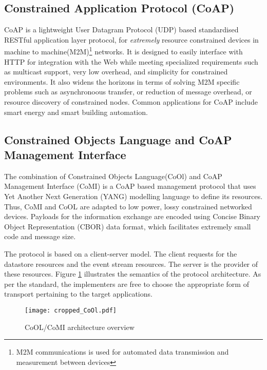 \documentclass[english]{tktltiki}
\begin{document}
\subsection{Constrained Application Protocol (CoAP)}

CoAP \cite{CoAPstandard} is a lightweight User Datagram Protocol (UDP) based standardised RESTful application layer protocol, for \textit{extremely} resource constrained devices in machine to machine(M2M)\footnote{M2M communications is used for automated data transmission and measurement between devices} networks. It is designed to easily interface with HTTP for integration with the Web while meeting specialized requirements such as multicast support, very low overhead, and simplicity for constrained environments\cite{CoAPstandard}. It also widens the horizons in terms of solving M2M specific problems such as asynchronoous transfer, or reduction of message overhead, or resource discovery of constrained nodes. Common applications for CoAP include smart energy and smart building automation.


\subsection{Constrained Objects Language and CoAP Management Interface}

The combination of Constrained Objects Language(CoOl)\cite{cool} and CoAP Management Interface (CoMI)\cite{comi} is a CoAP based management protocol that uses Yet Another Next Generation (YANG)\cite{yang} modelling language to define its resources. Thus, CoMI and CoOL are adapted to low power, lossy constrained networked devices. Payloads for the information exchange are encoded using Concise Binary Object Representation (CBOR)\cite{cobr} data format, which facilitates extremely small code and message size.

The protocol is based on a client-server model. The client requests for the datastore resources and the event stream resources. The server is the provider of these resources. Figure \ref{cool_archi} illustrates the semantics of the protocol architecture. As per the standard, the implementers are free to choose the appropriate form of transport pertaining to the target applications.

\begin{figure}[H]
\begin{center}
\texttt{[image: cropped\_CoOl.pdf]}
\caption{CoOL/CoMI architecture overview}
\label{cool_archi}
\end{center}
\end{figure}
\end{document}

